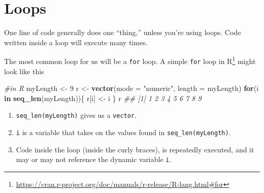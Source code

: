 \documentclass[12pt,krantz2]{krantz}
\makeatletter
\newenvironment{Shaded}{\begin{snugshade}}{\end{snugshade}}
\newcommand{\BuiltInTok}[1]{#1}
\newcommand{\CommentTok}[1]{\textcolor[rgb]{0.37,0.37,0.37}{\textit{#1}}}
\newcommand{\ControlFlowTok}[1]{\textcolor[rgb]{0.27,0.27,0.27}{\textbf{#1}}}
\newcommand{\DataTypeTok}[1]{\textcolor[rgb]{0.27,0.27,0.27}{#1}}
\newcommand{\DecValTok}[1]{\textcolor[rgb]{0.06,0.06,0.06}{#1}}
\newcommand{\FloatTok}[1]{\textcolor[rgb]{0.06,0.06,0.06}{#1}}
\newcommand{\KeywordTok}[1]{\textcolor[rgb]{0.27,0.27,0.27}{\textbf{#1}}}
\newcommand{\NormalTok}[1]{#1}
\newcommand{\OperatorTok}[1]{\textcolor[rgb]{0.43,0.43,0.43}{\textbf{#1}}}
\newcommand{\StringTok}[1]{\textcolor[rgb]{0.5,0.5,0.5}{#1}}
\providecommand{\tightlist}{%
  \setlength{\itemsep}{0pt}\setlength{\parskip}{0pt}}
\renewcommand{\href}[2]{#2\footnote{\url{#1}}}
\newenvironment{kframe}{%
\medskip{}
\setlength{\fboxsep}{.8em}
 \def\at@end@of@kframe{}%
 \ifinner\ifhmode%
  \def\at@end@of@kframe{\end{minipage}}%
  \begin{minipage}{\columnwidth}%
 \fi\fi%
 \def\FrameCommand##1{\hskip\@totalleftmargin \hskip-\fboxsep
 \colorbox{shadecolor}{##1}\hskip-\fboxsep
     \hskip-\linewidth \hskip-\@totalleftmargin \hskip\columnwidth}%
 \MakeFramed {\advance\hsize-\width
   \@totalleftmargin\z@ \linewidth\hsize
   \@setminipage}}%
 {\par\unskip\endMakeFramed%
 \at@end@of@kframe}
\renewenvironment{Shaded}{\begin{kframe}}{\end{kframe}}
\makeatother
\begin{document}
\begin{Shaded}
\end{Shaded}

\hypertarget{loops}{%
\section{Loops}\label{loops}}

One line of code generally does one ``thing,'' unless you're using loops. Code written inside a loop will execute many times.

The most common loop for us will be a \texttt{for} loop. A simple \href{https://cran.r-project.org/doc/manuals/r-release/R-lang.html\#for}{\texttt{for} loop in R} might look like this

\begin{Shaded}
\begin{Highlighting}[]
\CommentTok{#in R}
\NormalTok{myLength <-}\StringTok{ }\DecValTok{9}
\NormalTok{r <-}\StringTok{ }\KeywordTok{vector}\NormalTok{(}\DataTypeTok{mode =} \StringTok{"numeric"}\NormalTok{, }\DataTypeTok{length =}\NormalTok{ myLength)}
\ControlFlowTok{for}\NormalTok{(i }\ControlFlowTok{in} \KeywordTok{seq_len}\NormalTok{(myLength))\{}
\NormalTok{  r[i] <-}\StringTok{ }\NormalTok{i}
\NormalTok{\}}
\NormalTok{r}
\CommentTok{## [1] 1 2 3 4 5 6 7 8 9}
\end{Highlighting}
\end{Shaded}

\begin{enumerate}
\def\labelenumi{\arabic{enumi}.}
\tightlist
\item
  \texttt{seq\_len(myLength)} gives us a \texttt{vector}.
\item
  \texttt{i} is a variable that takes on the values found in \texttt{seq\_len(myLength)}.
\item
  Code inside the loop (inside the curly braces), is repeatedly executed, and it may or may not reference the dynamic variable \texttt{i}.
\end{enumerate}
\end{document}
